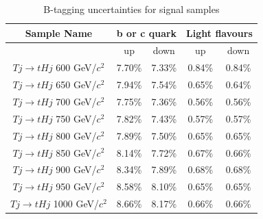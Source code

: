 \begin{table}[htbH]
\begin{center}
\begin{tabular}{|c|c|c|c|c|}
\hline 
Sample Name & \multicolumn{2}{c|}{b or c quark} & \multicolumn{2}{c|}{Light flavours} \\
\hline
 & up & down & up & down \\
\hline
$Tj\rightarrow tHj$ 600 GeV/$c^{2}$ & 7.70\% & 7.33\% & 0.84\% & 0.84\% \\
$Tj\rightarrow tHj$ 650 GeV/$c^{2}$ & 7.94\% & 7.54\% & 0.65\% & 0.64\% \\
$Tj\rightarrow tHj$ 700 GeV/$c^{2}$ & 7.75\% & 7.36\% & 0.56\% & 0.56\% \\
$Tj\rightarrow tHj$ 750 GeV/$c^{2}$ & 7.82\% & 7.43\% & 0.57\% & 0.57\% \\
$Tj\rightarrow tHj$ 800 GeV/$c^{2}$ & 7.89\% & 7.50\% & 0.65\% & 0.65\% \\
$Tj\rightarrow tHj$ 850 GeV/$c^{2}$ & 8.14\% & 7.72\% & 0.67\% & 0.66\% \\
$Tj\rightarrow tHj$ 900 GeV/$c^{2}$ & 8.34\% & 7.89\% & 0.68\% & 0.68\% \\
$Tj\rightarrow tHj$ 950 GeV/$c^{2}$ & 8.58\% & 8.10\% & 0.65\% & 0.65\% \\
$Tj\rightarrow tHj$ 1000 GeV/$c^{2}$ & 8.66\% & 8.17\% & 0.66\% & 0.66\% \\
\hline
\end{tabular}
\caption{B-tagging uncertainties for signal samples\label{tab:SFSys}}
\end{center}
\end{table}\clearpage

